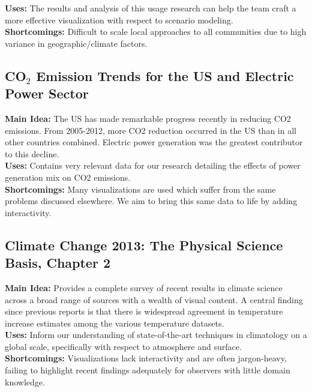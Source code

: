 \documentclass[sigconf,nonacm=true]{acmart}
\begin{document}
\textbf{Uses:} The results and analysis of this usage research can help the team craft a more effective visualization with respect to scenario modeling.  \\

\textbf{Shortcomings:}  Difficult to scale local approaches to all communities due to high variance in geographic/climate factors.         \\

\subsection{CO$_2$ Emission Trends for the US and Electric Power Sector \cite[Page Count:~14]{Emission_trend_KLEIN201633}}
\textbf{Main Idea:} The US has made remarkable progress recently in reducing CO2 emissions. From 2005-2012, more CO2 reduction occurred in the US than in all other countries combined. Electric power generation was the greatest contributor to this decline. \\

\textbf{Uses:} Contains very relevant data for our research detailing the effects of power generation mix on CO2 emissions.  \\

\textbf{Shortcomings:} Many visualizations are used which suffer from the same problems discussed elsewhere. We aim to bring this same data to life by adding interactivity.  \\

\subsection{Climate Change 2013: The Physical Science Basis, Chapter 2 \cite[Page Count:~90]{Climate_change_2013_stocker2014climate}}
\textbf{Main Idea:} Provides a complete survey of recent results in climate science across a broad range of sources with a wealth of visual content. A central finding since previous reports is that there is widespread agreement in temperature increase estimates among the various temperature datasets.  \\

\textbf{Uses:} Inform our understanding of state-of-the-art techniques in climatology on a global scale, specifically with respect to atmosphere and surface.  \\

\textbf{Shortcomings:} Visualizations lack interactivity and are often jargon-heavy, failing to highlight recent findings adequately for observers with little domain knowledge.   \\
\end{document}
